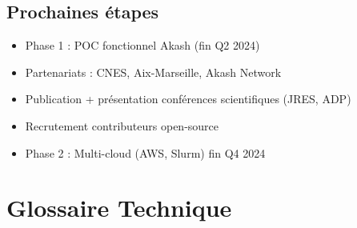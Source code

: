 \documentclass[11pt,a4paper]{article}
\begin{document}
	\subsection{Prochaines étapes}
	
	\begin{itemize}
		\item Phase 1 : POC fonctionnel Akash (fin Q2 2024)
		\item Partenariats : CNES, Aix-Marseille, Akash Network
		\item Publication + présentation conférences scientifiques (JRES, ADP)
		\item Recrutement contributeurs open-source
		\item Phase 2 : Multi-cloud (AWS, Slurm) fin Q4 2024
	\end{itemize}
	
	\vspace{1cm}
	
	\noindent{}
	
	\newpage
	
	\appendix
	
	\section{Glossaire Technique}
	
\end{document}
